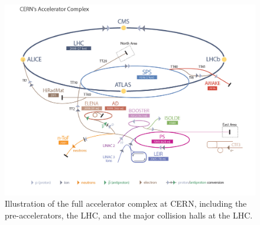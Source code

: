 \begin{figure}
\centering
  \includegraphics[width=0.75\linewidth]{plots/LHC/CERN_accelerators.jpg} %
  \caption{Illustration of the full accelerator complex at CERN, including the pre-accelerators, the LHC, and the major collision halls at the LHC.  \protect\cite{LHC_Accel_Cartoon}}
  \label{fig:cern_accel_cartoon}
\end{figure}